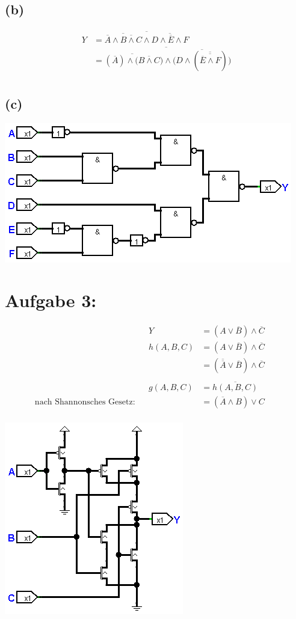 \documentclass[]{article}
\newcommand{\V}{\lor}
\newcommand{\A}{\land}
\newcommand{\T}[1]{\overline{#1}}
\begin{document}
\subsection*{(b)}
	\begin{align*}
		&& Y &= \T{\T{\T{A} \A \T{B \A C}} \A \T{D \A \T{E} \A F}} &&\\
		&& &= \T{\T{(\T{A}) \A (\T{B \A C}}) \A (\T{D \A (\T{\T{\T{E} \A F}})}}) &&\\
	\end{align*}
\subsection*{(c)}
	\begin{center}\includegraphics[scale=0.7]{Bilder/2_c.png}\end{center}

\section*{Aufgabe 3:}
	\begin{align*}
		&& Y &= (A \V \T{B}) \A \T{C} &&\\
		&& h(A,B,C) &= (A \V \T{B}) \A \T{C} &&\\
		&&  &= (\T{\T{A}} \V \T{B}) \A \T{C} &&\\
		\\
		&& g(A,B,C) &= \T{h(A,B,C)} &&\\
		\text{nach Shannonsches Gesetz:}&&  &= (\T{A} \A B) \V C &&\\
	\end{align*}
	\begin{center}\includegraphics[scale=0.7]{Bilder/3.png}\end{center}
\end{document}
